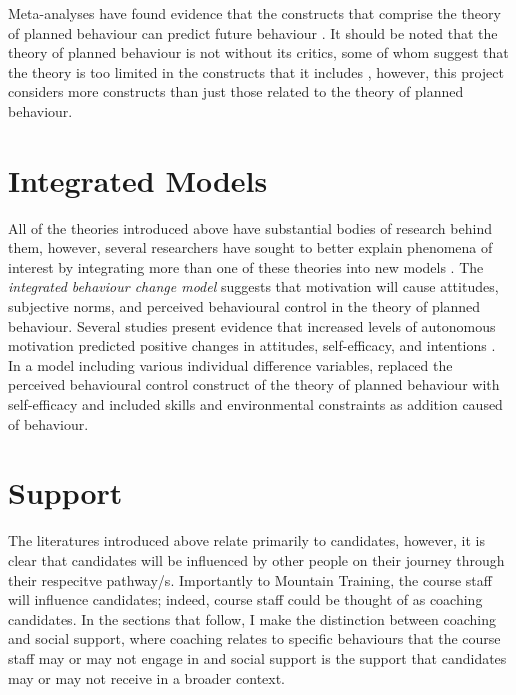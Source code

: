 \documentclass[
  12pt,
  a4paper,
]{book}
\begin{document}
Meta-analyses have found evidence that the constructs that comprise the theory of planned behaviour can predict future behaviour \citep{Armitage2001, Hagger2002}. It should be noted that the theory of planned behaviour is not without its critics, some of whom suggest that the theory is too limited in the constructs that it includes \citep[cf.~][]{Sniehotta2014}, however, this project considers more constructs than just those related to the theory of planned behaviour.

\hypertarget{integrated-models}{%
\section{Integrated Models}\label{integrated-models}}

All of the theories introduced above have substantial bodies of research behind them, however, several researchers have sought to better explain phenomena of interest by integrating more than one of these theories into new models \citep[e.g.,][]{Fishbein2000, Hagger2009, Hagger2014, Hamilton2017}. The \emph{integrated behaviour change model} \citep{Hagger2009, Hagger2014, Hamilton2017} suggests that motivation will cause attitudes, subjective norms, and perceived behavioural control in the theory of planned behaviour. Several studies present evidence that increased levels of autonomous motivation predicted positive changes in attitudes, self-efficacy, and intentions \citep[e.g.,][]{Hagger2009, Jacobs2011}. In a model including various individual difference variables, \citet{Fishbein2000} replaced the perceived behavioural control construct of the theory of planned behaviour with self-efficacy \citep[n.b.,][ suggested that perceived behavioural control is similar to the construct of self-efficacy]{Ajzen1991} and included skills and environmental constraints as addition caused of behaviour.

\hypertarget{gen-intro-support}{%
\section{Support}\label{gen-intro-support}}

The literatures introduced above relate primarily to candidates, however, it is clear that candidates will be influenced by other people on their journey through their respecitve pathway/s. Importantly to Mountain Training, the course staff will influence candidates; indeed, course staff could be thought of as coaching candidates. In the sections that follow, I make the distinction between coaching and social support, where coaching relates to specific behaviours that the course staff may or may not engage in and social support is the support that candidates may or may not receive in a broader context.
\end{document}
